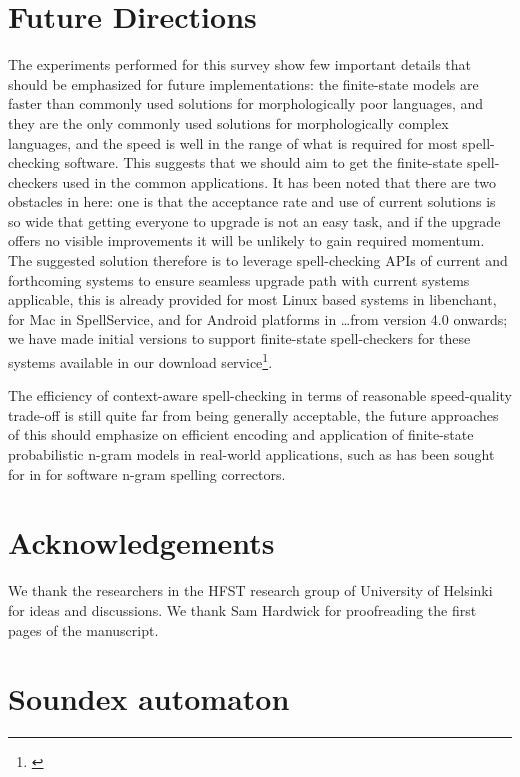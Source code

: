\documentclass[a4paper,12pt]{article}
\begin{document}
\section{Future Directions}
\label{sec:future}

The experiments performed for this survey show few important details that
should be emphasized for future implementations: the finite-state models are
faster than commonly used solutions for morphologically poor languages, and
they are the only commonly used solutions for morphologically complex
languages, and the speed is well in the range of what is required for most
spell-checking software. This suggests that we should aim to get the
finite-state spell-checkers used in the common applications. It has been noted
that there are two obstacles in here: one is that the acceptance rate and use
of current solutions is so wide that getting everyone to upgrade is not an
easy task, and if the upgrade offers no visible improvements it will be
unlikely to gain required momentum. The suggested solution therefore is to
leverage spell-checking APIs of current and forthcoming systems to ensure
seamless upgrade path with current systems applicable, this is already provided
for most Linux based systems in libenchant, for Mac in SpellService, and for
Android platforms in \ldots from version 4.0 onwards; we have made initial
versions to support finite-state spell-checkers for these systems available in
our download service\footnote{\url{}}.

The efficiency of context-aware spell-checking in terms of reasonable 
speed-quality trade-off is still quite far from being generally acceptable,
the future approaches of this should emphasize on efficient encoding and
application of finite-state probabilistic n-gram models in real-world
applications, such as has been sought for in \cite{} for software n-gram
spelling correctors.

\section*{Acknowledgements}

We thank the researchers in the HFST research group of University of Helsinki
for ideas and discussions. We thank Sam Hardwick for proofreading the first
pages of the manuscript.



\section*{Soundex automaton}
\label{appendix:soundex}
\end{document}
